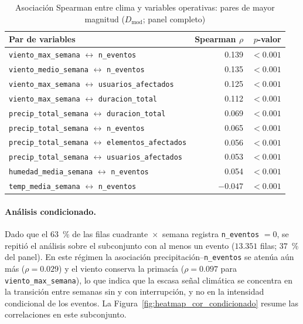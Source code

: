     \begin{table}[!htbp]
    \centering
    \small
    \caption{Asociación Spearman entre clima y variables operativas: pares de mayor magnitud ($D_{\mathrm{mod}}$; panel completo)}
    \label{tab:clima_operativo_cor}
    \begin{tabular}{@{}l r r@{}}
    \toprule
    \textbf{Par de variables} & \textbf{Spearman $\rho$} & \textbf{$p$-valor} \\
    \midrule
    \texttt{viento\_max\_semana} $\leftrightarrow$ \texttt{n\_eventos}            & 0.139 & $< 0{.}001$ \\
    \texttt{viento\_medio\_semana} $\leftrightarrow$ \texttt{n\_eventos}           & 0.135 & $< 0{.}001$ \\
    \texttt{viento\_max\_semana} $\leftrightarrow$ \texttt{usuarios\_afectados}    & 0.125 & $< 0{.}001$ \\
    \texttt{viento\_max\_semana} $\leftrightarrow$ \texttt{duracion\_total}        & 0.112 & $< 0{.}001$ \\
    \texttt{precip\_total\_semana} $\leftrightarrow$ \texttt{duracion\_total}      & 0.069 & $< 0{.}001$ \\
    \texttt{precip\_total\_semana} $\leftrightarrow$ \texttt{n\_eventos}           & 0.065 & $< 0{.}001$ \\
    \texttt{precip\_total\_semana} $\leftrightarrow$ \texttt{elementos\_afectados} & 0.056 & $< 0{.}001$ \\
    \texttt{precip\_total\_semana} $\leftrightarrow$ \texttt{usuarios\_afectados}  & 0.053 & $< 0{.}001$ \\
    \texttt{humedad\_media\_semana} $\leftrightarrow$ \texttt{n\_eventos}          & 0.054 & $< 0{.}001$ \\
    \texttt{temp\_media\_semana} $\leftrightarrow$ \texttt{n\_eventos}             & $-0.047$ & $< 0{.}001$ \\
    \bottomrule
    \end{tabular}
    \end{table}
    
    \paragraph{Análisis condicionado.} Dado que el $63$~\% de las filas cuadrante~$\times$~semana registra \texttt{n\_eventos} $= 0$, se repitió el análisis sobre el subconjunto con al menos un evento ($13{.}351$ filas; $37$~\% del panel). En este régimen la asociación precipitación--\texttt{n\_eventos} se atenúa aún más ($\rho = 0{.}029$) y el viento conserva la primacía ($\rho = 0{.}097$ para \texttt{viento\_max\_semana}), lo que indica que la escasa señal climática se concentra en la transición entre semanas sin y con interrupción, y no en la intensidad condicional de los eventos. La Figura~\ref{fig:heatmap_cor_condicionado} resume las correlaciones en este subconjunto.
    
